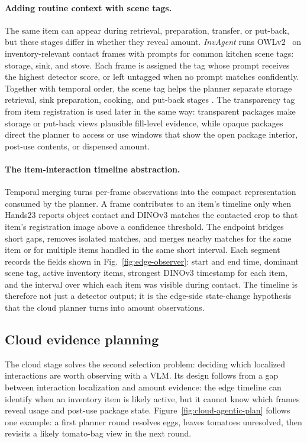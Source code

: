 \documentclass[sigconf,anonymous,nonacm]{acmart}
\newcommand{\sys}{\textit{InvAgent}\xspace}
\begin{document}
\paragraph{Adding routine context with scene tags.}
The same item can appear during retrieval, preparation, transfer, or
put-back, but these stages differ in whether they reveal amount. \sys
runs OWLv2~\cite{minderer2023scaling} on inventory-relevant contact
frames with prompts for common kitchen scene tags: storage, sink, and
stove. Each frame is assigned the tag whose prompt receives the highest
detector score, or left untagged when no prompt matches confidently.
Together with temporal order, the scene tag helps the planner separate
storage retrieval, sink preparation, cooking, and put-back stages
\cite{golettoAMEGOActiveMemory2024,huang2025building,nagarajan2020ego}.
The transparency tag from item registration is used later in the same
way: transparent packages make storage or put-back views plausible
fill-level evidence, while opaque packages direct the planner to access
or use windows that show the open package interior, post-use contents, or
dispensed amount.

\paragraph{The item-interaction timeline abstraction.}
Temporal merging turns per-frame observations into the compact
representation consumed by the planner. A frame contributes to an item's
timeline only when Hands23 reports object contact and DINOv3 matches the
contacted crop to that item's registration image above a confidence
threshold. The endpoint bridges short gaps, removes isolated matches,
and merges nearby matches for the same item or for multiple items
handled in the same short interval. Each segment records the fields shown
in Fig.~\ref{fig:edge-observer}: start and end time, dominant scene tag,
active inventory items, strongest DINOv3 timestamp for each item, and
the interval over which each item was visible during contact. The
timeline is therefore not just a detector output; it is the edge-side
state-change hypothesis that the cloud planner turns into amount
observations.


\subsection{Cloud evidence planning}
The cloud stage solves the second selection problem: deciding which
localized interactions are worth observing with a VLM. Its design
follows from a gap between interaction localization and amount evidence:
the edge timeline can identify when an inventory item is likely active,
but it cannot know which frames reveal usage and post-use package state.
Figure~\ref{fig:cloud-agentic-plan} follows one example: a first planner
round resolves eggs, leaves tomatoes unresolved, then revisits a likely
tomato-bag view in the next round.
\end{document}
